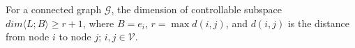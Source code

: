 \documentclass[a4paper,11pt]{article}
\begin{document}
\begin{lemma}\label{cesarlemma}
For a connected graph $\mathcal{G}$, the dimension of controllable subspace $dim\langle L;B\rangle\geq r+1$, where $B=e_i$, $r=\max d(i,j)$, and $d(i,j)$ is the distance from node $i$ to node $j$; $i,j\in\mathcal{V}.$
\end{lemma}
\end{document}
